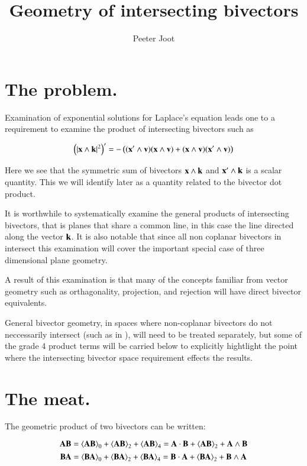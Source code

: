 \documentclass{article}      %
\title{Geometry of intersecting bivectors}
\author{Peeter Joot}         %
\newcommand{\gpgrade}[2] {{\left\langle{{#1}}\right\rangle}_{#2}}
\begin{document}

\maketitle{}

\section{ The problem. }

Examination of exponential solutions for Laplace's equation leads one to
a requirement to examine the product of intersecting bivectors such as

\[
\left(\lvert{\mathbf{x}\wedge \mathbf{k}}\rvert^2\right)' = -\left(
(\mathbf{x}' \wedge \mathbf{v})(\mathbf{x} \wedge \mathbf{v})
+(\mathbf{x} \wedge \mathbf{v})(\mathbf{x}' \wedge \mathbf{v})
\right)
\]

Here we see that the symmetric sum of bivectors $\mathbf{x} \wedge \mathbf{k}$ and $\mathbf{x}' \wedge \mathbf{k}$ is a scalar quantity.  This we will identify later as a quantity
related to the bivector dot product.

It is worthwhile to systematically examine the
general products of intersecting bivectors, that is planes that share a common line, in this case the line directed along the vector $\mathbf{k}$.
It is also notable that since all non coplanar bivectors in  intersect
this
examination will cover the important special case of three dimensional
plane geometry.

A result of this examination is that many of the concepts familiar from
vector geometry such as
orthagonality, projection, and rejection will have direct bivector
equivalents.

General bivector geometry, in spaces where non-coplanar bivectors do not 
neccessarily intersect (such as in ), will need to be treated separately,
but some of the grade 4 product terms will be carried below to explicitly
hightlight the point where the intersecting bivector space requirement
effects the results.

\section{The meat.}

The geometric product of two bivectors can be written:

\begin{equation}\label{eqn:ABprod}
\BA \BB = 
\gpgrade{\BA \BB}{0}
+\gpgrade{\BA \BB}{2}
+\gpgrade{\BA \BB}{4}
= 
{\BA \cdot \BB}
+\gpgrade{\BA \BB}{2}
+{\BA \wedge \BB}
\end{equation}
\begin{equation}\label{eqn:BAprod}
\BB \BA = 
\gpgrade{\BB \BA}{0}
+\gpgrade{\BB \BA}{2}
+\gpgrade{\BB \BA}{4}
= 
{\BB \cdot \BA}
+\gpgrade{\BB \BA}{2}
+{\BB \wedge \BA}
\end{equation}
\end{document}
